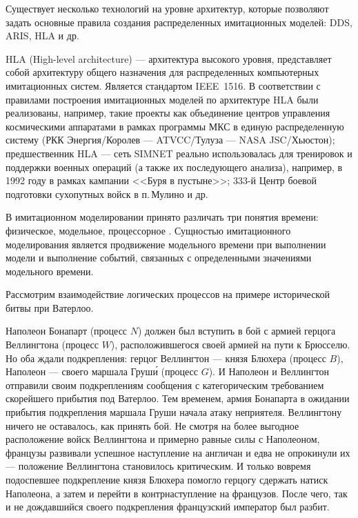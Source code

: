 Существует несколько технологий на уровне архитектур, которые позволяют задать основные правила создания распределенных имитационных моделей: DDS, ARIS, HLA и др.

HLA (High-level architecture) --- архитектура высокого уровня, представляет собой архитектуру общего назначения для распределенных компьютерных имитационных систем. Является стандартом IEEE~1516.
В соответствии с правилами построения имитационных моделей по архитектуре HLA были реализованы, например, такие проекты как объединение центров управления космическими аппаратами в рамках программы МКС в единую распределенную систему (РКК Энергия/Королев --- ATVCC/Тулуза --- NASA JSC/Хьюстон); предшественник HLA --- сеть SIMNET реально использовалась для тренировок и поддержки военных операций (а также их последующего анализа), например, в 1992 году в рамках кампании <<Буря в пустыне>>; 333-й Центр боевой подготовки сухопутных войск в п.\,Мулино и др.

В имитационном моделировании принято различать три понятия времени: физическое, модельное, процессорное \cite{okol}. Сущностью имитационного моделирования является продвижение модельного времени при выполнении модели и выполнение событий, связанных с определенными значениями модельного времени.

Рассмотрим взаимодействие логических процессов на примере исторической битвы при Ватерлоо.

Наполеон Бонапарт (процесс $N$) должен был вступить в бой с армией герцога Веллингтона (процесс $W$), расположившегося своей армией на пути к Брюсселю. Но оба ждали подкрепления: герцог Веллингтон --- князя Блюхера (процесс $B$), Наполеон --- своего маршала Груш\'и (процесс $G$). И Наполеон и Веллингтон отправили своим подкреплениям сообщения с категорическим требованием скорейшего прибытия под Ватерлоо. Тем временем, армия Бонапарта в ожидании прибытия подкрепления маршала Груши начала атаку неприятеля. Веллингтону ничего не оставалось, как принять бой. Не смотря на более выгодное расположение войск Веллингтона и примерно равные силы с Наполеоном, французы развивали успешное наступление на англичан и едва не опрокинули их --- положение Веллингтона становилось критическим. И только вовремя подоспевшее подкрепление князя Блюхера помогло герцогу сдержать натиск Наполеона, а затем и перейти в контрнаступление на французов. После чего, так и не дождавшийся своего подкрепления французский император был разбит.

